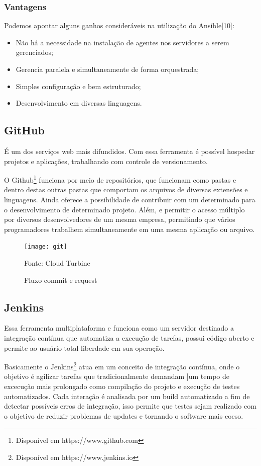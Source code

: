 \subsubsection{Vantagens}
Podemos apontar alguns ganhos consideráveis na utilização do Ansible[10]:
\begin{itemize}
	\item Não há a necessidade na instalação de agentes nos servidores a serem gerenciados;
	\item Gerencia paralela e simultaneamente de forma orquestrada; 
	\item Simples configuração e bem estruturado;
	\item Desenvolvimento em diversas linguagens.
\end{itemize}

\subsection{GitHub }
É um dos serviços web mais difundidos. Com essa ferramenta é possível hospedar projetos e aplicações, trabalhando com controle de versionamento.

O Github\footnote{Disponível em https://www.github.com} funciona por meio de repositórios, que funcionam como pastas e dentro destas outras pastas que comportam os arquivos de diversas extensões e linguagens. Ainda oferece a possibilidade de contribuir com um determinado para o desenvolvimento de determinado projeto. Além, e permitir o acesso múltiplo por diversos desenvolvedores de um mesma empresa, permitindo que vários programadores trabalhem simultaneamente em uma mesma aplicação ou arquivo.

\begin{figure}
	\centering
	\texttt{[image: git]}
	\caption{Fluxo commit e request}
	Fonte: Cloud Turbine\footnotemark
	\label{fig:git}
\end{figure}

\subsection{Jenkins}

Essa ferramenta multiplataforma e funciona como um servidor destinado a integração contínua que automatiza a execução de tarefas, possui código aberto e permite ao usuário total liberdade em sua operação.

Basicamente o Jenkins\footnote{Disponível em https://www.jenkins.io} atua em um conceito de integração contínua, onde o objetivo é agilizar tarefas que tradicionalmente demandam ]um tempo de excecução mais prolongado como compilação do projeto e execução de testes automatizados. Cada interação é analisada por um build automatizado a fim de detectar possíveis erros de integração, isso permite que testes sejam realizado com o objetivo de reduzir problemas de updates e tornando o software mais coeso.\cite{atalay}

